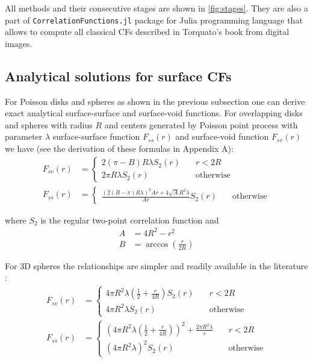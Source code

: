 \documentclass[reprint,amsmath,amssymb,aps,pre]{revtex4-1}
\newcommand{\code}[1]{\colorbox{light-gray}{\texttt{#1}}}
\begin{document}
All methods and their consecutive stages are shown in \cref{fig:stages}. They
are also a part of \code{CorrelationFunctions.jl} package \cite{ourpapaer} for
Julia programming language that allows to compute all classical CFs described in
Torquato’s book \cite{Torq_book} from digital images.

\subsection{Analytical solutions for surface CFs}
For Poisson disks and spheres as shown in the previous subsection one can derive
exact analytical surface-surface and surface-void functions. For overlapping
disks and spheres with radius $R$ and centers generated by Poisson point process
with parameter $λ$ surface-surface function $F_{ss}(r)$ and surface-void
function $F_{sv}(r)$ we have (see the derivation of these formulas in Appendix
A):
\begin{align}
  F_{sv}(r) &= \left\{
  \begin{array}{ll}
    2(\pi - B)R \lambda S_2(r) & \quad r<2R \\
    2\pi R \lambda S_2(r) & \quad \text{otherwise}
  \end{array} \right. \label{eq:fsv_final} \\
  F_{ss}(r) &= \left\{
  \begin{array}{ll}
    \frac{(2(B-\pi)R\lambda)^2Ar + 4\sqrt{A}R^2\lambda}{Ar}S_2(r) & \quad \text{otherwise}
  \end{array} \right. \label{eq:fss_final}
\end{align}

where $S_2$ is the regular two-point correlation function and
\begin{align*}
  A &= 4R^2 - r^2 \\
  B &= \arccos(\frac{r}{2R})
\end{align*}

For 3D spheres the relationships are simpler and readily available in the
literature \cite{Torq_book}\cite{Ma_Torq}:
\begin{align*}
  F_{sv}(r) &= \left\{
  \begin{array}{ll}
    4\pi R^2\lambda(\frac{1}{2} + \frac{r}{4R})S_2(r) & \quad r<2R \\
    4\pi R^2\lambda S_2(r) & \quad \text{otherwise}
  \end{array} \right. \\
  F_{ss}(r) &= \left\{
  \begin{array}{ll}
    {(4\pi R^2 \lambda (\frac{1}{2} + \frac{r}{4R}))^2 + \frac{2\pi R^2 \lambda}{r}} & \quad r<2R \\
    (4\pi R^2 \lambda)^2 S_2(r) & \quad \text{otherwise}
  \end{array} \right.
\end{align*}
\end{document}
